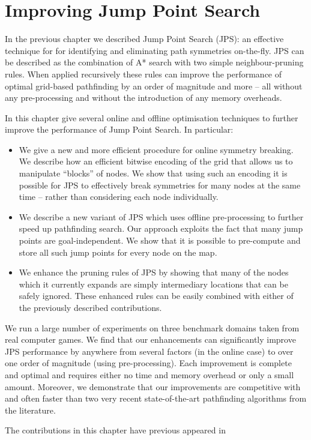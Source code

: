 \chapter{Improving Jump Point Search}
\label{cha::jps2}
In the previous chapter we described Jump Point Search (JPS): an effective
technique for for identifying and eliminating path symmetries on-the-fly.  JPS
can be described as the combination of A* search with two simple
neighbour-pruning rules. When applied recursively these rules can improve the
performance of optimal grid-based pathfinding by an order of magnitude and
more -- all without any pre-processing and without the introduction of any
memory overheads. 

In this chapter give several online and offline optimisation techniques to 
further improve the performance of Jump Point Search. In particular:
\begin{itemize}
\item We give a new and more efficient procedure for online symmetry breaking. 
We describe how an efficient bitwise encoding of the grid that
allows us to manipulate ``blocks'' of nodes.
We show that using such an encoding it is possible
for JPS to effectively break symmetries for many nodes at the same time -- 
rather than considering each node individually.
\item We describe a new variant of JPS which uses offline pre-processing to 
further speed up pathfinding search. Our approach exploits the fact that many
jump points are goal-independent. We show that it is possible to pre-compute 
and store all such jump points for every node on the map.
\item We enhance the pruning rules of JPS by showing that many of the nodes
which it currently expands are simply intermediary locations that can be
safely ignored. These enhanced rules can be easily combined with either
of the previously described contributions.
\end{itemize}

We run a large number of experiments on three benchmark domains taken from real
computer games. We find that our  enhancements can significantly improve JPS performance by
anywhere from several factors  (in the online case) to over one order of magnitude
(using pre-processing). Each improvement is complete and optimal
and requires either no time and memory overhead or only a small amount.
Moreover, we demonstrate that our improvements are competitive with and often 
faster than two very recent state-of-the-art pathfinding algorithms from the literature.

The contributions in this chapter have previous appeared in~\citep{haraborG14}


